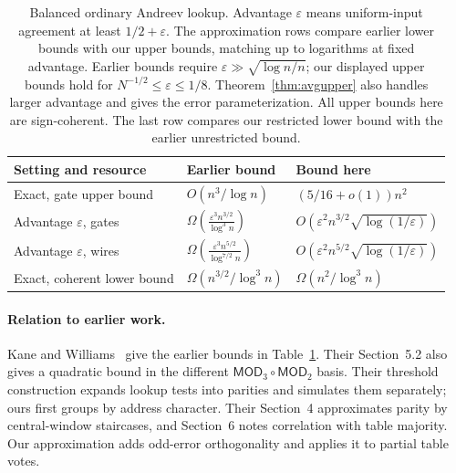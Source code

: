 \documentclass[11pt]{article}
\begin{document}
\begin{table}[t]
\centering
\small
\setlength{\tabcolsep}{4pt}
\renewcommand{\arraystretch}{1.25}
\begin{tabular}{@{}lll@{}}
\toprule
Setting and resource & Earlier bound~\cite{KW} & Bound here \\
\midrule
Exact, gate upper bound
 & $O(n^3/\log n)$ & $(5/16+o(1))n^2$ \\
Advantage $\varepsilon$, gates
 & $\Omega\!\left(\frac{\varepsilon^3n^{3/2}}{\log^3 n}\right)$
 & $O\!\left(\varepsilon^2n^{3/2}\sqrt{\log(1/\varepsilon)}\right)$ \\
Advantage $\varepsilon$, wires
 & $\Omega\!\left(\frac{\varepsilon^3n^{5/2}}{\log^{7/2}n}\right)$
 & $O\!\left(\varepsilon^2n^{5/2}\sqrt{\log(1/\varepsilon)}\right)$ \\
Exact, coherent lower bound
 & $\Omega(n^{3/2}/\log^3 n)$ & $\Omega(n^2/\log^3 n)$ \\
\bottomrule
\end{tabular}
\caption{Balanced ordinary Andreev lookup. Advantage $\varepsilon$ means
uniform-input agreement at least $1/2+\varepsilon$. The approximation rows
compare earlier lower bounds with our upper bounds, matching up to logarithms
at fixed advantage. Earlier bounds require $\varepsilon\gg\sqrt{\log n/n}$;
our displayed upper bounds hold for $N^{-1/2}\le\varepsilon\le1/8$.
Theorem~\ref{thm:avgupper} also handles larger advantage and gives the error
parameterization. All upper bounds here are sign-coherent. The last row
compares our restricted lower bound with the earlier unrestricted bound.}
\label{tab:bounds}
\end{table}

\paragraph{Relation to earlier work.}
Kane and Williams~\cite[Theorems~1.1--1.2]{KW} give the earlier bounds
in Table~\ref{tab:bounds}. Their Section~5.2 also gives a quadratic bound
in the different $\mathsf{MOD}_3\circ\mathsf{MOD}_2$ basis. Their threshold
construction expands lookup tests into parities and simulates them
separately; ours first groups by address character. Their Section~4
approximates parity by central-window staircases, and Section~6 notes
correlation with table majority. Our approximation adds odd-error
orthogonality and applies it to partial table votes.
\end{document}
